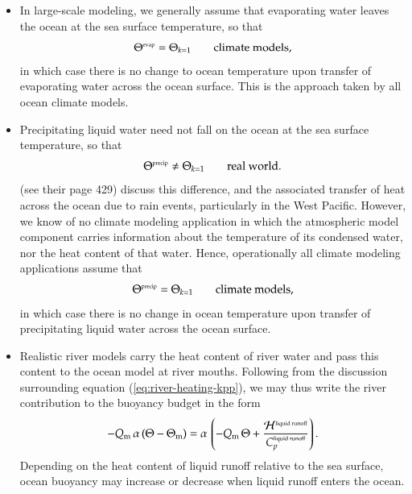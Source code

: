   \begin{itemize}

  \item In large-scale modeling, we generally assume that evaporating
    water leaves the ocean at the sea surface temperature, so that
\begin{equation}
   \Theta^{\mbox{\tiny evap}} = \Theta_{k=1} \qquad \mbox{climate models},
\end{equation}
in which case there is no change to ocean temperature upon transfer of
evaporating water across the ocean surface.  This is the approach
taken by all ocean climate models.

\item Precipitating liquid water need not fall on the ocean at the sea
  surface temperature, so that
\begin{equation}
   \Theta^{\mbox{\tiny precip}} \ne \Theta_{k=1} \qquad \mbox{real world}.
\end{equation}
\cite{KanthaClaysonII} (see their page 429) discuss this difference,
and the associated transfer of heat across the ocean due to rain
events, particularly in the West Pacific.  However, we know of no
climate modeling application in which the atmospheric model component
carries information about the temperature of its condensed water, nor
the heat content of that water.  Hence, operationally all climate
modeling applications assume that
\begin{equation}
   \Theta^{\mbox{\tiny precip}} = \Theta_{k=1} \qquad \mbox{climate models},
\end{equation}
in which case there is no change in ocean temperature upon transfer of
precipitating liquid water across the ocean surface.

\item Realistic river models carry the heat content of river water and
  pass this content to the ocean model at river mouths.  Following
  from the discussion surrounding equation
  (\ref{eq:river-heating-kpp}), we may thus write the river
  contribution to the buoyancy budget in the form
\begin{equation}
 -Q_{\mbox{\scriptsize m}} \, \alpha \, (\Theta - \Theta_{\mbox{\scriptsize m}}) = \alpha \, \left(
  -Q_{\mbox{\scriptsize m}} \, \Theta  + \frac{  {\cal H}^{\mbox{\tiny liquid runoff}} }  {C_{p}^{\mbox{\tiny liquid runoff}}} \right).
\end{equation}
Depending on the heat content of liquid runoff relative to the sea
surface, ocean buoyancy may increase or decrease when liquid runoff
enters the ocean.

\end{itemize}

